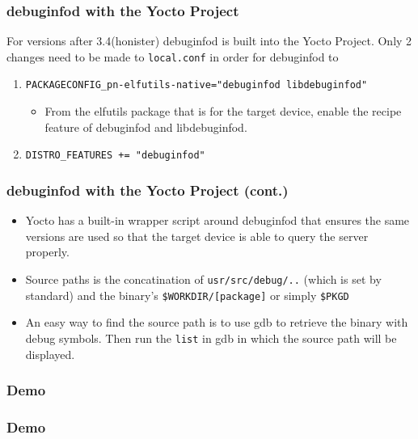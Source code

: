 \documentclass[12pt]{beamer}
\begin{document}
\begin{frame}[fragile]
   \frametitle{debuginfod with the Yocto Project}
   For versions after 3.4(honister) debuginfod is built into the Yocto Project. Only 2 
   changes need to be made to \color{gray} \verb|local.conf| \color{black} in order for debuginfod
   to 
   \begin{enumerate}
      \color{gray}
      \fontsize{10pt}{10pt}\selectfont
      \item \verb|PACKAGECONFIG_pn-elfutils-native="debuginfod libdebuginfod"|
         \begin{itemize}
            \item From the elfutils package that is for the target device, enable the recipe feature of
               debuginfod and libdebuginfod.
         \end{itemize}
      \item \verb|DISTRO_FEATURES += "debuginfod"|
   \end{enumerate}
\end{frame}

\begin{frame}[fragile]
   \frametitle{debuginfod with the Yocto Project (cont.)}
   \begin{itemize}
      \item Yocto has a built-in wrapper script around debuginfod that ensures the same versions are used so
        that the target device is able to query the server properly.
      \item Source paths is the concatination of \color{gray} \verb|usr/src/debug/..| \color{black} (which is
         set by standard) and the binary's \color{gray} \verb|$WORKDIR/[package]|\color{black} or simply
         \color{gray} \verb|$PKGD|
         \color{black}
      \item An easy way to find the source path is to use gdb to retrieve the binary with debug symbols. 
         Then run the \color{gray}\verb|list| \color{black} in gdb in which the source path will be displayed.
   \end{itemize}
\end{frame}




\begin{frame}
   \frametitle{ Demo}
\end{frame}

\begin{frame}
   \frametitle{ Demo}
\end{frame}
\end{document}
